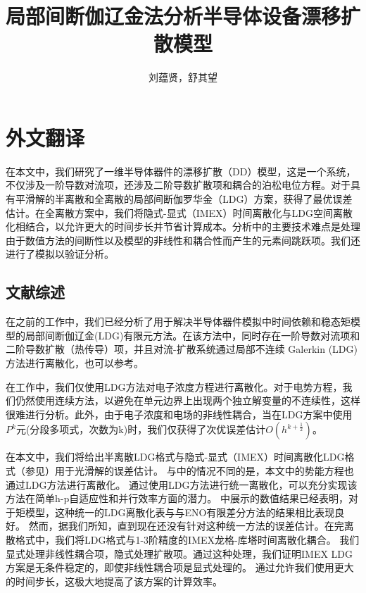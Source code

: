 \cleardoublepage

\newrefsection
\sectionmajornumbering

\chapter{外文翻译}
\title{局部间断伽辽金法分析半导体设备漂移扩散模型}
\author{刘蕴贤，舒其望}
\date{}
\maketitle
{}
在本文中，我们研究了一维半导体器件的漂移扩散（DD）模型，这是一个系统，不仅涉及一阶导数对流项，还涉及二阶导数扩散项和耦合的泊松电位方程。对于具有平滑解的半离散和全离散的局部间断伽罗华金（LDG）方案，获得了最优误差估计。在全离散方案中，我们将隐式-显式（IMEX）时间离散化与LDG空间离散化相结合，以允许更大的时间步长并节省计算成本。分析中的主要技术难点是处理由于数值方法的间断性以及模型的非线性和耦合性而产生的元素间跳跃项。我们还进行了模拟以验证分析。

\section{文献综述}
在之前的工作\parencite{liu2010errorc}中，我们已经分析了用于解决半导体器件模拟中时间依赖和稳态矩模型的局部间断伽辽金(LDG)有限元方法。在该方法中，同时存在一阶导数对流项和二阶导数扩散（热传导）项，并且对流-扩散系统通过局部不连续 Galerkin (LDG) 方法进行离散化\parencite{cockburn1998local,cockburn2001runge}，也可以参考\parencite{bank1983numerical,bank1998finite,chainais2003finite,bessemoulin2012finite}。

在工作\parencite{liu2010errorc}中，我们仅使用LDG方法对电子浓度方程进行离散化。对于电势方程，我们仍然使用连续方法，以避免在单元边界上出现两个独立解变量的不连续性，这样很难进行分析。此外，由于电子浓度和电场的非线性耦合，当在LDG方案中使用$P^k$元(分段多项式，次数为k)时，我们仅获得了次优误差估计$O(h^{k+\frac{1}{2}})$。

在本文中，我们将给出半离散LDG格式与隐式-显式（IMEX）时间离散化LDG格式（参见\parencite{wang2015stability,wang2015stabilityd}）用于光滑解的误差估计。
与\parencite{liu2010errorc}中的情况不同的是，本文中的势能方程也通过LDG方法进行离散化。
通过使用LDG方法进行统一离散化，可以充分实现该方法在简单h-p自适应性和并行效率方面的潜力。
\parencite{liu2004local,liu2007locala}中展示的数值结果已经表明，对于矩模型，这种统一的LDG离散化表与与ENO有限差分方法\parencite{jerome1994energy}的结果相比表现良好。
然而，据我们所知，直到现在还没有针对这种统一方法的误差估计。在完离散格式中，我们将LDG格式与1-3阶精度的IMEX龙格-库塔时间离散化耦合。
我们显式处理非线性耦合项，隐式处理扩散项。通过这种处理，我们证明IMEX LDG方案是无条件稳定的，即使非线性耦合项是显式处理的。
通过允许我们使用更大的时间步长，这极大地提高了该方案的计算效率。

